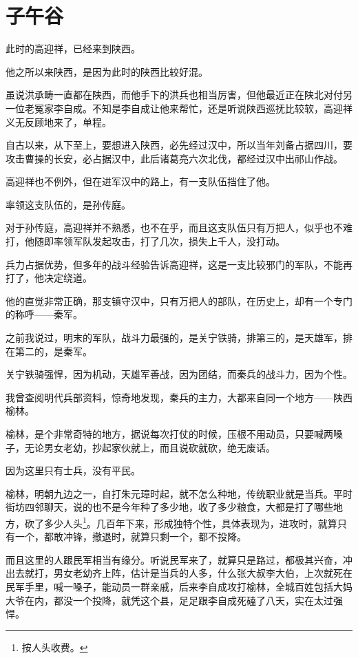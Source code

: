 \section{子午谷}
\ifnum{}
	\begin{multicols}{\theparacolNo}
\fi
此时的高迎祥，已经来到陕西。

他之所以来陕西，是因为此时的陕西比较好混。

虽说洪承畴一直都在陕西，而他手下的洪兵也相当厉害，但他最近正在陕北对付另一位老冤家李自成。不知是李自成让他来帮忙，还是听说陕西巡抚比较软，高迎祥义无反顾地来了，单程。

自古以来，从下至上，要想进入陕西，必先经过汉中，所以当年刘备占据四川，要攻击曹操的长安，必占据汉中，此后诸葛亮六次北伐，都经过汉中出祁山作战。

高迎祥也不例外，但在进军汉中的路上，有一支队伍挡住了他。

率领这支队伍的，是孙传庭。

对于孙传庭，高迎祥并不熟悉，也不在乎，而且这支队伍只有万把人，似乎也不难打，他随即率领军队发起攻击，打了几次，损失上千人，没打动。

兵力占据优势，但多年的战斗经验告诉高迎祥，这是一支比较邪门的军队，不能再打了，他决定绕道。

他的直觉非常正确，那支镇守汉中，只有万把人的部队，在历史上，却有一个专门的称呼——秦军。

之前我说过，明末的军队，战斗力最强的，是关宁铁骑，排第三的，是天雄军，排在第二的，是秦军。

关宁铁骑强悍，因为机动，天雄军善战，因为团结，而秦兵的战斗力，因为个性。

我曾查阅明代兵部资料，惊奇地发现，秦兵的主力，大都来自同一个地方——陕西榆林。

榆林，是个非常奇特的地方，据说每次打仗的时候，压根不用动员，只要喊两嗓子，无论男女老幼，抄起家伙就上，而且说砍就砍，绝无废话。

因为这里只有士兵，没有平民。

榆林，明朝九边之一，自打朱元璋时起，就不怎么种地，传统职业就是当兵。平时街坊四邻聊天，说的也不是今年种了多少地，收了多少粮食，大都是打了哪些地方，砍了多少人头\footnote{按人头收费。}。几百年下来，形成独特个性，具体表现为，进攻时，就算只有一个，都敢冲锋，撤退时，就算只剩一个，都不投降。

而且这里的人跟民军相当有缘分。听说民军来了，就算只是路过，都极其兴奋，冲出去就打，男女老幼齐上阵，估计是当兵的人多，什么张大叔李大伯，上次就死在民军手里，喊一嗓子，能动员一群亲戚，后来李自成攻打榆林，全城百姓包括大妈大爷在内，都没一个投降，就凭这个县，足足跟李自成死磕了八天，实在太过强悍。


\end{multicols}
